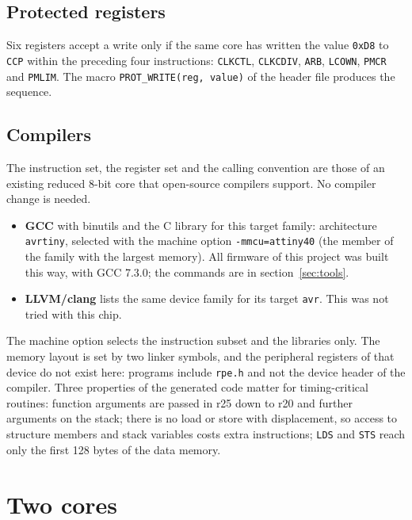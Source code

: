 \documentclass[10pt,a4paper]{article}
\newcommand{\reg}[1]{\texttt{#1}}
\begin{document}
\subsection{Protected registers}

Six registers accept a write only if the same core has written the value \texttt{0xD8} to \reg{CCP} within the
preceding four instructions: \reg{CLKCTL}, \reg{CLKCDIV}, \reg{ARB}, \reg{LCOWN}, \reg{PMCR} and \reg{PMLIM}. The
macro \texttt{PROT\_WRITE(reg, value)} of the header file produces the sequence.

\subsection{Compilers}\label{sec:compiler}

The instruction set, the register set and the calling convention are those of an existing reduced 8-bit core
that open-source compilers support. No compiler change is needed.

\begin{itemize}
\item \textbf{GCC} with binutils and the C library for this target family: architecture \texttt{avrtiny}, selected
with the machine option \texttt{-mmcu=attiny40} (the member of the family with the largest memory). All firmware
of this project was built this way, with GCC 7.3.0; the commands are in section~\ref{sec:tools}.
\item \textbf{LLVM/clang} lists the same device family for its target \texttt{avr}. This was not tried with
this chip.
\end{itemize}

The machine option selects the instruction subset and the libraries only. The memory layout is set by two
linker symbols, and the peripheral registers of that device do not exist here: programs include \texttt{rpe.h}
and not the device header of the compiler. Three properties of the generated code matter for timing-critical
routines: function arguments are passed in r25 down to r20 and further arguments on the stack; there is no
load or store with displacement, so access to structure members and stack variables costs extra instructions;
\texttt{LDS} and \texttt{STS} reach only the first 128 bytes of the data memory.

\section{Two cores}\label{sec:twocore}
\end{document}

